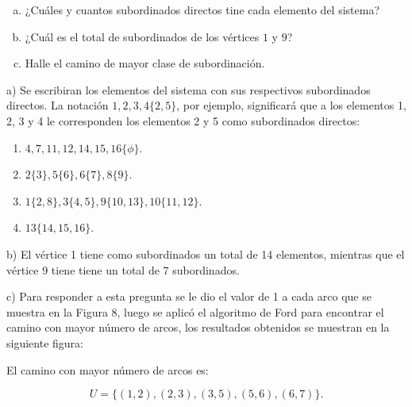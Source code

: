 \documentclass[autocontact]{gaceta}
\begin{document}
    \begin{center}
        \begin{enumerate}[a)]
            \item ¿Cuáles y cuantos subordinados directos tine cada elemento del sistema?
            \item ¿Cuál es el total de subordinados de los vértices $1$ y $9$?
            \item Halle el camino de mayor clase de subordinación.
        \end{enumerate}        
    \end{center}

    

    \pagebreak

    a) Se escribiran los elementos del sistema con sus respectivos subordinados directos.
    La notación $1,2,3,4\{2,5\}$, por ejemplo, significará que a los elementos 1, 2, 3 y 4 le corresponden 
    los elementos 2 y 5 como subordinados directos:

    \begin{center}
        \begin{enumerate}
            \item $4,7,11,12,14,15,16\{\phi \}.$
            \item $2\{3\}, 5\{6\}, 6\{7\},  8\{9\}.$
            \item $1\{2,8\},  3\{4,5\},   9\{10,13\}, 10\{11,12\}.$
            \item $13\{14,15,16\}.$
        \end{enumerate}
    \end{center}

    b) El vértice 1 tiene como subordinados un total de 14 elementos, mientras que el vértice 9 tiene
    tiene un total de 7 subordinados.

    c) Para responder a esta pregunta se le dio el valor de 1 a cada arco que se muestra en la Figura 8,
    luego se aplicó el algoritmo de Ford para encontrar el camino con mayor número de arcos, los 
    resultados obtenidos se muestran en la siguiente figura:

    
    \pagebreak
    El camino con mayor número de arcos es:
    \begin{center}
        \begin{equation}
            U = \{ (1,2), (2,3), (3,5), (5,6), (6,7) \}.
        \end{equation}        
    \end{center}
\end{document}
